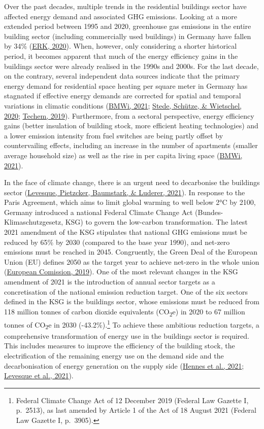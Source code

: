 \documentclass[12pt,twoside]{reedthesis}
\begin{document}
Over the past decades, multiple trends in the residential buildings sector have affected energy demand and associated GHG emissions. Looking at a more extended period between 1995 and 2020, greenhouse gas emissions in the entire building sector (including commercially used buildings) in Germany have fallen by 34\% (\protect\hyperlink{ref-erk20}{ERK, 2020}). When, however, only considering a shorter historical period, it becomes apparent that much of the energy efficiency gains in the buildings sector were already realised in the 1990s and 2000s. For the last decade, on the contrary, several independent data sources indicate that the primary energy demand for residential space heating per square meter in Germany has stagnated if effective energy demands are corrected for spatial and temporal variations in climatic conditions (\protect\hyperlink{ref-bmwi21}{BMWi, 2021}; \protect\hyperlink{ref-stede_etal20}{Stede, Schütze, \& Wietschel, 2020}; \protect\hyperlink{ref-techem19}{Techem, 2019}). Furthermore, from a sectoral perspective, energy efficiency gains (better insulation of building stock, more efficient heating technologies) and a lower emission intensity from fuel switches are being partly offset by countervailing effects, including an increase in the number of apartments (smaller average household size) as well as the rise in per capita living space (\protect\hyperlink{ref-bmwi21}{BMWi, 2021}).

In the face of climate change, there is an urgent need to decarbonise the buildings sector (\protect\hyperlink{ref-levesque_etal21}{Levesque, Pietzcker, Baumstark, \& Luderer, 2021}). In response to the Paris Agreement, which aims to limit global warming to well below 2°C by 2100, Germany introduced a national Federal Climate Change Act (Bundes-Klimaschutzgesetz, KSG) to govern the low-carbon transformation. The latest 2021 amendment of the KSG stipulates that national GHG emissions must be reduced by 65\% by 2030 (compared to the base year 1990), and net-zero emissions must be reached in 2045. Congruently, the Green Deal of the European Union (EU) defines 2050 as the target year to achieve net-zero in the whole union (\protect\hyperlink{ref-europeancomission19}{European Comission, 2019}). One of the most relevant changes in the KSG amendment of 2021 is the introduction of annual sector targets as a concretisation of the national emission reduction target. One of the six sectors defined in the KSG is the buildings sector, whose emissions must be reduced from 118 million tonnes of carbon dioxide equivalents (CO\textsubscript{2}e) in 2020 to 67 million tonnes of CO\textsubscript{2}e in 2030 (-43.2\%).\footnote{Federal Climate Change Act of 12 December 2019 (Federal Law Gazette I, p.~2513), as last amended by Article 1 of the Act of 18 August 2021 (Federal Law Gazette I, p.~3905).} To achieve these ambitious reduction targets, a comprehensive transformation of energy use in the buildings sector is required. This includes measures to improve the efficiency of the building stock, the electrification of the remaining energy use on the demand side and the decarbonisation of energy generation on the supply side (\protect\hyperlink{ref-hennes_etal21}{Hennes et al., 2021}; \protect\hyperlink{ref-levesque_etal21}{Levesque et al., 2021}).
\end{document}
